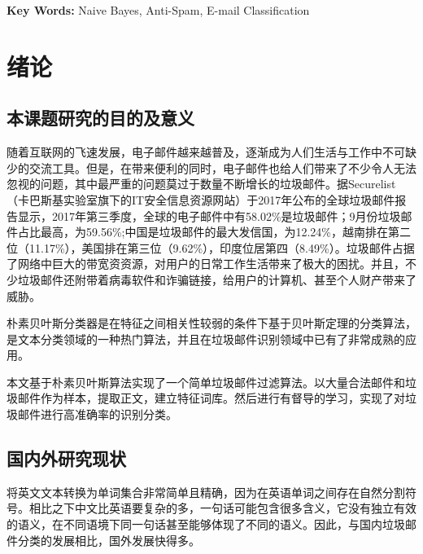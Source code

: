 \documentclass[UTF8,zihao=-4]{ctexart}
\begin{document}
  \noindent{}\textbf{Key Words: }Naive Bayes, Anti-Spam, E-mail Classification
\newpage

\linespread{1.25}
\tableofcontents
\newpage

\songti{}
\newpage
\section{绪论}
\subsection{本课题研究的目的及意义}
随着互联网的飞速发展，电子邮件越来越普及，逐渐成为人们生活与工作中不可缺少的交流工具。但是，在带来便利的同时，电子邮件也给人们带来了不少令人无法忽视的问题，其中最严重的问题莫过于数量不断增长的垃圾邮件。据Securelist（卡巴斯基实验室旗下的IT安全信息资源网站）于2017年公布的全球垃圾邮件报告显示，2017年第三季度，全球的电子邮件中有58.02\%是垃圾邮件；9月份垃圾邮件占比最高，为59.56\%;中国是垃圾邮件的最大发信国，为12.24\%，越南排在第二位（11.17\%），美国排在第三位（9.62\%），印度位居第四（8.49\%）\cite{securelist}。垃圾邮件占据了网络中巨大的带宽资资源，对用户的日常工作生活带来了极大的困扰。并且，不少垃圾邮件还附带着病毒软件和诈骗链接，给用户的计算机、甚至个人财产带来了威胁。

朴素贝叶斯分类器是在特征之间相关性较弱的条件下基于贝叶斯定理的分类算法，是文本分类领域的一种热门算法，并且在垃圾邮件识别领域中已有了非常成熟的应用。

本文基于朴素贝叶斯算法实现了一个简单垃圾邮件过滤算法。以大量合法邮件和垃圾邮件作为样本，提取正文，建立特征词库。然后进行有督导的学习，实现了对垃圾邮件进行高准确率的识别分类。

\subsection{国内外研究现状}

将英文文本转换为单词集合非常简单且精确，因为在英语单词之间存在自然分割符号。相比之下中文比英语要复杂的多，一句话可能包含很多含义，它没有独立有效的语义，在不同语境下同一句话甚至能够体现了不同的语义。因此，与国内垃圾邮件分类的发展相比，国外发展快得多。
\end{document}
